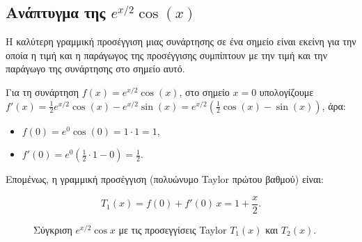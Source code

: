 \documentclass[a4paper, 11pt]{article}
\providecommand{\tightlist}{\setlength{\itemsep}{0pt}\setlength{\parskip}{0pt}}
\begin{document}
\subsection{\texorpdfstring{Ανάπτυγμα της
\(e^{x/2}\cos(x)\)}{Ανάπτυγμα της e\^{}\{x/2\}\textbackslash cos(x)}}\label{ux3b1ux3bdux3acux3c0ux3c4ux3c5ux3b3ux3bcux3b1-ux3c4ux3b7ux3c2-ex2cosx}

Η καλύτερη γραμμική προσέγγιση μιας συνάρτησης σε ένα σημείο είναι
εκείνη για την οποία η τιμή και η παράγωγος της προσέγγισης συμπίπτουν
με την τιμή και την παράγωγο της συνάρτησης στο σημείο αυτό.

Για τη συνάρτηση \(f(x) = e^{x/2} \cos(x)\), στο σημείο \(x = 0\)
υπολογίζουμε
\(f'(x) = \frac{1}{2} e^{x/2} \cos(x) - e^{x/2} \sin(x) = e^{x/2} \left( \frac{1}{2} \cos(x) - \sin(x) \right)\),
άρα:

\begin{itemize}
\tightlist
\item
  \(f(0) = e^{0} \cos(0) = 1 \cdot 1 = 1\),\\
\item
  \(f'(0) = e^{0} \left( \frac{1}{2} \cdot 1 - 0 \right) = \frac{1}{2}\).
\end{itemize}

Επομένως, η γραμμική προσέγγιση (πολυώνυμο Taylor πρώτου βαθμού) είναι:

\[
\boxed{T_1(x) = f(0) + f'(0) \, x = 1 + \frac{x}{2}}.
\]

\begin{figure}[htbp]
\centering
{}
\caption{Σύγκριση $e^{x/2}\cos x$ με τις προσεγγίσεις Taylor $T_1(x)$ και $T_2(x)$.}
\label{fig:expcoslinear}
\end{figure}
\end{document}

